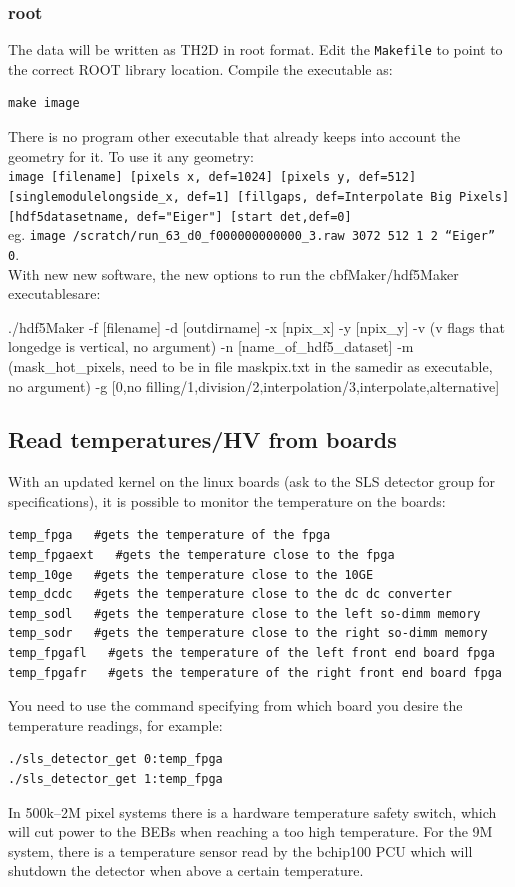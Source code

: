 \documentclass{article}
\begin{document}
{{{\subsubsection{root}
The data will be written as TH2D in root format. Edit the {\tt{Makefile}} to point to the correct ROOT library location. Compile the executable as:
\begin{verbatim}
make image 
\end{verbatim}
There is no program other executable that already keeps into account the geometry for it.
To use it any geometry:\\
{\tt{image [filename] [pixels x, def=1024] [pixels y, def=512] [singlemodulelongside\_x, def=1] [fillgaps, def=Interpolate Big Pixels] [hdf5datasetname, def="Eiger"] [start det,def=0]}}\\
eg.
{\tt image /scratch/run\_63\_d0\_f000000000000\_3.raw  3072 512 1 2 ``Eiger'' 0}.\\

With new new software, the new options to run the cbfMaker/hdf5Maker executablesare: 

./hdf5Maker -f [filename] -d [outdirname] -x [npix\_x] -y [npix\_y] -v  (v flags that longedge is vertical, no argument) -n [name\_of\_hdf5\_dataset] -m (mask\_hot\_pixels, need to be in file maskpix.txt in the samedir as executable, no argument) -g [0,no filling/1,division/2,interpolation/3,interpolate,alternative]  

\subsection{Read temperatures/HV from boards}

With an updated kernel on the linux boards (ask to the SLS detector group for specifications), it is possible to monitor the temperature on the boards: 
\begin{verbatim}
temp_fpga   #gets the temperature of the fpga
temp_fpgaext   #gets the temperature close to the fpga
temp_10ge   #gets the temperature close to the 10GE
temp_dcdc   #gets the temperature close to the dc dc converter
temp_sodl   #gets the temperature close to the left so-dimm memory
temp_sodr   #gets the temperature close to the right so-dimm memory
temp_fpgafl   #gets the temperature of the left front end board fpga
temp_fpgafr   #gets the temperature of the right front end board fpga

\end{verbatim}

You need to use the command specifying from which board you desire the temperature readings, for example:
\begin{verbatim}
./sls_detector_get 0:temp_fpga
./sls_detector_get 1:temp_fpga
\end{verbatim}
In 500k--2M pixel systems there is a hardware temperature safety switch, which will cut power to the BEBs when reaching a too high temperature. For the 9M system, there is a temperature sensor read by the bchip100 PCU which will shutdown the detector when above a certain temperature.
 
}}}
\end{document}
